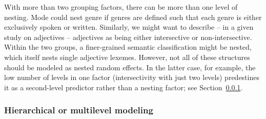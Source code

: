 \documentclass[a4paper,12pt]{article}
\begin{document}
With more than two grouping factors, there can be more than one level of nesting.
Mode could nest genre if genres are defined such that each genre is either exclusively spoken or written.
Similarly, we might want to describe -- in a given study on adjectives -- adjectives as being either intersective or non-intersective.
Within the two groups, a finer-grained semantic classification might be nested, which itself nests single adjective lexemes.
However, not all of these structures should be modeled as nested random effects.
In the latter case, for example, the low number of levels in one factor (intersectivity with just two levels) predestines it as a second-level predictor rather than a nesting factor; see Section~\ref{sec:hierarchicalormultilevelmodels}.

\subsubsection{Hierarchical or multilevel modeling}
\label{sec:hierarchicalormultilevelmodels}
\end{document}
